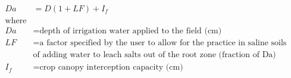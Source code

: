 \documentclass[fleqn, oneside, 11pt]{article}%
\begin{document}
\begin{preview}
\begin{align*}%
Da & = D(1+LF)+I_{f} \\ 
\text{where} \nonumber \\
Da & =  \text{depth of irrigation water applied to the field (cm)} \nonumber \\
LF & =  \text{a factor specified by the user to allow for the practice in saline soils}  \nonumber \\
& \text{of adding water to leach salts out of the root zone (fraction of Da)} \nonumber \\
I_{f} & =  \text{crop canopy interception capacity (cm)} \nonumber \\
\end{align*} 
\end{preview}
\end{document}
